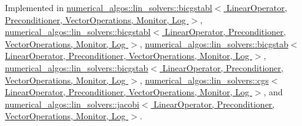 Implemented in \hyperlink{classnumerical__algos_1_1lin__solvers_1_1bicgstabl_a2dd4f6cdd207b1a77aa94831fbdf9839}{numerical\-\_\-algos\-::lin\-\_\-solvers\-::bicgstabl$<$ Linear\-Operator, Preconditioner, Vector\-Operations, Monitor, Log $>$}, \hyperlink{classnumerical__algos_1_1lin__solvers_1_1bicgstabl_a2dd4f6cdd207b1a77aa94831fbdf9839}{numerical\-\_\-algos\-::lin\-\_\-solvers\-::bicgstabl$<$ Linear\-Operator, Preconditioner, Vector\-Operations, Monitor, Log $>$}, \hyperlink{classnumerical__algos_1_1lin__solvers_1_1bicgstab_ac3df95058825e4a8a1ed6bf838f10669}{numerical\-\_\-algos\-::lin\-\_\-solvers\-::bicgstab$<$ Linear\-Operator, Preconditioner, Vector\-Operations, Monitor, Log $>$}, \hyperlink{classnumerical__algos_1_1lin__solvers_1_1bicgstab_ac3df95058825e4a8a1ed6bf838f10669}{numerical\-\_\-algos\-::lin\-\_\-solvers\-::bicgstab$<$ Linear\-Operator, Preconditioner, Vector\-Operations, Monitor, Log $>$}, \hyperlink{classnumerical__algos_1_1lin__solvers_1_1cgs_a76503cf7b66739a4fa4571f034aa960e}{numerical\-\_\-algos\-::lin\-\_\-solvers\-::cgs$<$ Linear\-Operator, Preconditioner, Vector\-Operations, Monitor, Log $>$}, and \hyperlink{classnumerical__algos_1_1lin__solvers_1_1jacobi_aebc8f746eb9b5f412c6ea79a4149621f}{numerical\-\_\-algos\-::lin\-\_\-solvers\-::jacobi$<$ Linear\-Operator, Preconditioner, Vector\-Operations, Monitor, Log $>$}.



